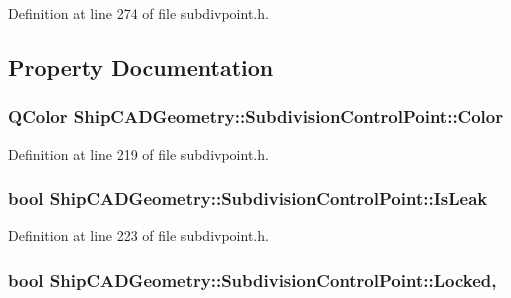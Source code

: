 Definition at line 274 of file subdivpoint.\-h.



\subsection{Property Documentation}
\hypertarget{classShipCADGeometry_1_1SubdivisionControlPoint_aecfab9d47ea8e16714ce095e3e055e55}{
\subsubsection[{Color}]{\setlength{\rightskip}{0pt plus 5cm}Q\-Color Ship\-C\-A\-D\-Geometry\-::\-Subdivision\-Control\-Point\-::\-Color\hspace{0.3cm}{\ttfamily [read]}}}\label{classShipCADGeometry_1_1SubdivisionControlPoint_aecfab9d47ea8e16714ce095e3e055e55}


Definition at line 219 of file subdivpoint.\-h.

\hypertarget{classShipCADGeometry_1_1SubdivisionControlPoint_a722a0531b6f27404b82850de2305dbea}{
\subsubsection[{Is\-Leak}]{\setlength{\rightskip}{0pt plus 5cm}bool Ship\-C\-A\-D\-Geometry\-::\-Subdivision\-Control\-Point\-::\-Is\-Leak\hspace{0.3cm}{\ttfamily [read]}}}\label{classShipCADGeometry_1_1SubdivisionControlPoint_a722a0531b6f27404b82850de2305dbea}


Definition at line 223 of file subdivpoint.\-h.

\hypertarget{classShipCADGeometry_1_1SubdivisionControlPoint_a1e192709a33919e76207ebce39c4c916}{
\subsubsection[{Locked}]{\setlength{\rightskip}{0pt plus 5cm}bool Ship\-C\-A\-D\-Geometry\-::\-Subdivision\-Control\-Point\-::\-Locked\hspace{0.3cm}{\ttfamily [read]}, {\ttfamily [write]}}}\label{classShipCADGeometry_1_1SubdivisionControlPoint_a1e192709a33919e76207ebce39c4c916}


